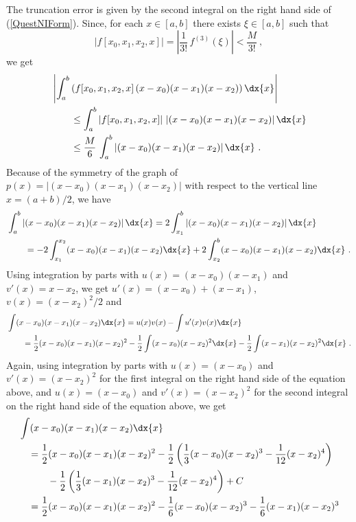 {The truncation error is given by the second integral on the right hand
side of (\ref{QuestNIForm}). Since, for each $x\in [a,b]$ there exists
$\xi\in [a,b]$ such that
\[
\left| f[x_0,x_1,x_2,x] \right| =
\left| \frac{1}{3!}\,f^{(3)}(\xi) \right| < \frac{M}{3!} \ ,
\]
we get
\begin{align*}
&\left| \int_a^b \left(f[x_0,x_1,x_2,x]\,(x-x_0)(x-x_1)(x-x_2)
  \right)\dx{x} \right| \\
&\qquad \leq \int_a^b \left|f[x_0,x_1,x_2,x]\right|\,
\left|(x-x_0)(x-x_1)(x-x_2) \right|\dx{x} \\
&\qquad \leq \frac{M}{6} \, \int_a^b
\left|(x-x_0)(x-x_1)(x-x_2) \right|\dx{x} \ .
\end{align*}
Because of the symmetry of the graph of
$p(x)=|(x-x_0)(x-x_1)(x-x_2)|$ with respect to the vertical line
$x=(a+b)/2$, we have
\begin{align*}
&\int_a^b \left|(x-x_0)(x-x_1)(x-x_2) \right|\dx{x} 
= 2\int_{x_1}^b \left|(x-x_0)(x-x_1)(x-x_2) \right|\dx{x} \\
&\qquad = - 2\int_{x_1}^{x_2} (x-x_0)(x-x_1)(x-x_2) \dx{x}
+ 2\int_{x_2}^b (x-x_0)(x-x_1)(x-x_2) \dx{x} \ .
\end{align*}
Using integration by parts with $u(x) = (x-x_0)(x-x_1)$ and
$v'(x) = x-x_2$, we get $u'(x) = (x-x_0) + (x-x_1)$,
$\displaystyle v(x) = (x-x_2)^2/2$ and
\begin{align*}
&\int (x-x_0)(x-x_1)(x-x_2) \dx{x}
= u(x)v(x) - \int u'(x) v(x) \dx{x} \\  
&\qquad = \frac{1}{2}(x-x_0)(x-x_1)(x-x_2)^2
- \frac{1}{2} \int (x-x_0)(x-x_2)^2\dx{x}
- \frac{1}{2} \int (x-x_1)(x-x_2)^2\dx{x} \ .
\end{align*}
Again, using integration by parts with $u(x) = (x-x_0)$ and
$\displaystyle v'(x) = (x-x_2)^2$ for the first integral on the right hand side
of the equation above, and $u(x) = (x-x_0)$ and
$\displaystyle v'(x) = (x-x_2)^2$
for the second integral on the right hand side of the equation above,
we get
\begin{align*}
& \int (x-x_0)(x-x_1)(x-x_2) \dx{x} \\
&\quad = \frac{1}{2}(x-x_0)(x-x_1)(x-x_2)^2 - \frac{1}{2}
\left( \frac{1}{3}(x-x_0)(x-x_2)^3 - \frac{1}{12}(x-x_2)^4\right) \\
&\quad\qquad - \frac{1}{2}
\left( \frac{1}{3}(x-x_1)(x-x_2)^3 - \frac{1}{12}(x-x_2)^4\right) + C \\
&\quad= \frac{1}{2}(x-x_0)(x-x_1)(x-x_2)^2 - \frac{1}{6}(x-x_0)(x-x_2)^3
- \frac{1}{6}(x-x_1)(x-x_2)^3 \\

\end{align*}}
